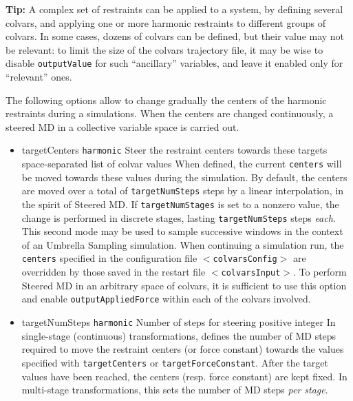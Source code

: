 \textbf{Tip:} A complex set of restraints can be applied to a system,
by defining several colvars, and applying one or more harmonic
restraints to different groups of colvars.  In some cases, dozens of
colvars can be defined, but their value may not be relevant: to
limit the size of the colvars trajectory file, it
may be wise to disable \texttt{outputValue} for such ``ancillary''
variables, and leave it enabled only for ``relevant'' ones.

\label{sec:colvarbias_smd}

The following options allow to change gradually the centers of the harmonic restraints during a simulations.
When the centers are changed continuously, a steered MD in a collective variable space is carried out.

\begin{itemize}

\item %
  \key
    {targetCenters}{%
    \texttt{harmonic}}{%
    Steer the restraint centers towards these
    targets}{%
    space-separated list of colvar values}{%
    When defined, the current \texttt{centers} will be moved towards
    these values during the simulation.
    By default, the centers are moved over a total of 
    \texttt{targetNumSteps} steps by a linear interpolation, in the
    spirit of Steered MD.
    If \texttt{targetNumStages} is set to a nonzero value, the
    change is performed in discrete stages, lasting \texttt{targetNumSteps}
    steps \emph{each}. This second mode may be used to sample successive
    windows in the context
    of an Umbrella Sampling simulation.
    When continuing a simulation
    run, the \texttt{centers} specified in the configuration file
    \texttt{$<$colvarsConfig$>$} are overridden by those saved in
    the restart file \texttt{$<$colvarsInput$>$}.  To perform Steered
    MD in an arbitrary space of colvars, it is
    sufficient to use this option and enable
    \texttt{outputAppliedForce} within each of the colvars involved.}

\item %
  \key
    {targetNumSteps}{%
    \texttt{harmonic}}{%
    Number of steps for steering}{%
    positive integer}{%
    In single-stage (continuous) transformations, defines the number of MD
    steps required to move the restraint centers (or force constant)
    towards the values specified with \texttt{targetCenters} or
    \texttt{targetForceConstant}.
    After the target values have been reached, the centers (resp. force
    constant) are kept fixed. In multi-stage transformations, this sets the
    number of MD steps \emph{per stage}.}


\end{itemize}
